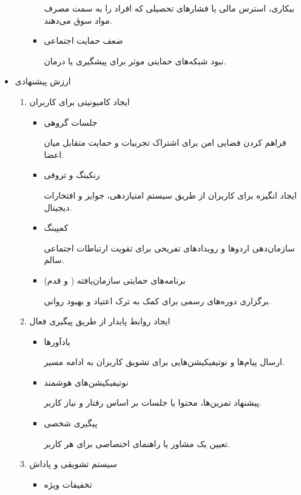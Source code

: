 \documentclass[dvipsnames, svgnames, x11names, 11pt]{article}
\begin{document}
\begin{itemize}
\begin{enumerate}
\begin{itemize}
بیکاری، استرس مالی یا فشارهای تحصیلی که افراد را به سمت مصرف مواد سوق می‌دهند.  

\item 
ضعف حمایت اجتماعی

نبود شبکه‌های حمایتی موثر برای پیشگیری یا درمان.  
\end{itemize}
\end{enumerate}

\item 
ارزش پیشنهادی

\begin{enumerate}
\item 
ایجاد کامیونیتی برای کاربران 

\begin{itemize}
\item 
جلسات گروهی

فراهم کردن فضایی امن برای اشتراک تجربیات و حمایت متقابل میان اعضا.  

\item 
رنکینگ و تروفی

ایجاد انگیزه برای کاربران از طریق سیستم امتیازدهی، جوایز و افتخارات دیجیتال.  

\item 
کمپینگ

سازمان‌دهی اردوها و رویدادهای تفریحی برای تقویت ارتباطات اجتماعی سالم.  

\item 
برنامه‌های حمایتی سازمان‌یافته ( و قدم)

برگزاری دوره‌های رسمی برای کمک به ترک اعتیاد و بهبود روانی.  
\end{itemize} 

\item 
ایجاد روابط پایدار از طریق پیگیری فعال  
\begin{itemize}
\item 
یادآورها

ارسال پیام‌ها و نوتیفیکیشن‌هایی برای تشویق کاربران به ادامه مسیر.  

\item 
نوتیفیکیشن‌های هوشمند

پیشنهاد تمرین‌ها، محتوا یا جلسات بر اساس رفتار و نیاز کاربر.  

\item 
پیگیری شخصی

تعیین یک مشاور یا راهنمای اختصاصی برای هر کاربر.  
\end{itemize} 

\item 
سیستم تشویقی و پاداش  
\begin{itemize}
\item 
تخفیفات ویژه


\end{itemize}
\end{enumerate}
\end{itemize}
\end{document}
